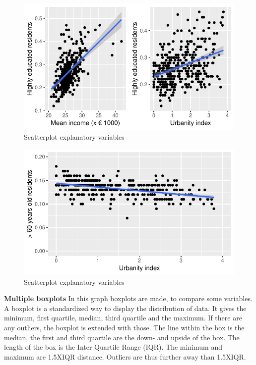 \documentclass[11pt,]{article}
\begin{document}
\begin{figure}[H]

{\centering \includegraphics{Report_files/figure-latex/unnamed-chunk-7-1} 

}

\caption{\label{5}Scatterplot explanatory variables}\label{fig:unnamed-chunk-71}
\end{figure}\begin{figure}[H]

{\centering \includegraphics{Report_files/figure-latex/unnamed-chunk-7-2} 

}

\caption{\label{5}Scatterplot explanatory variables}\label{fig:unnamed-chunk-72}
\end{figure}

\textbf{Multiple boxplots} In this graph boxplots are made, to compare
some variables. A boxplot is a standardized way to display the
distribution of data. It gives the minimum, first quartile, median,
third quartile and the maximum. If there are any outliers, the boxplot
is extended with those. The line within the box is the median, the first
and third quartile are the down- and upside of the box. The length of
the box is the Inter Quartile Range (IQR). The minimum and maximum are
1.5XIQR distance. Outliers are thus further away than 1.5XIQR.
\end{document}
